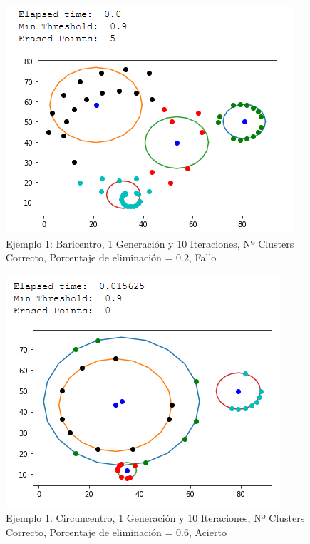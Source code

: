 \documentclass[conference,a4paper]{IEEEtran}
\begin{document}
\begin{figure}[H]
\centering
\includegraphics[scale=0.65]{Experimentacion/Ejemplo1/ej1_b_1_10_le}
\caption{Ejemplo 1: Baricentro, 1 Generación y 10 Iteraciones,  Nº Clusters Correcto, Porcentaje de eliminación = 0.2, Fallo\\}
\end{figure}

\begin{figure}[H]
\centering
\includegraphics[scale=0.65]{Experimentacion/Ejemplo1/ej1_c_1_10_me_correct}
\caption{Ejemplo 1: Circuncentro, 1 Generación y 10 Iteraciones,  Nº Clusters Correcto, Porcentaje de eliminación = 0.6, Acierto\\}
\end{figure}
\end{document}
